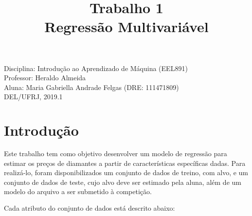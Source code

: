 \documentclass[11pt]{article}
\title{\textbf{Trabalho 1\\
                   Regressão Multivariável}}
\begin{document}
    
    
    \maketitle
    
    \begin{flushleft}
    Disciplina: Introdução ao Aprendizado de Máquina (EEL891)\\
    Professor: Heraldo Almeida\\
    Aluna: Maria Gabriella Andrade Felgas (DRE: 111471809)\\
    DEL/UFRJ, 2019.1
    \end{flushleft}

    \hypertarget{introduuxe7uxe3o}{%
\section{Introdução}\label{introduuxe7uxe3o}}

    Este trabalho tem como objetivo desenvolver um modelo de regressão para
estimar os preços de diamantes a partir de características específicas
dadas. Para realizá-lo, foram disponibilizados um conjunto de dados de
treino, com alvo, e um conjunto de dados de teste, cujo alvo deve ser
estimado pela aluna, além de um modelo do arquivo a ser submetido à
competição.

Cada atributo do conjunto de dados está descrito abaixo:
\end{document}
